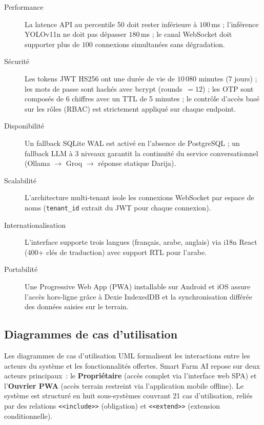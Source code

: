 \begin{description}
  \item[Performance] La latence API au percentile 50 doit rester inférieure à
        $100$\,ms ; l'inférence YOLOv11n ne doit pas dépasser $180$\,ms ; le canal
        WebSocket doit supporter plus de $100$ connexions simultanées sans dégradation.
  \item[Sécurité] Les tokens JWT HS256 ont une durée de vie de $10\,080$ minutes
        (7 jours) ; les mots de passe sont hachés avec bcrypt (rounds~$= 12$) ;
        les OTP sont composés de 6 chiffres avec un TTL de 5 minutes ; le
        contrôle d'accès basé sur les rôles (RBAC) est strictement appliqué
        sur chaque endpoint.
  \item[Disponibilité] Un fallback SQLite WAL est activé en l'absence de PostgreSQL ;
        un fallback LLM à 3 niveaux garantit la continuité du service conversationnel
        (Ollama $\rightarrow$ Groq $\rightarrow$ réponse statique Darija).
  \item[Scalabilité] L'architecture multi-tenant isole les connexions WebSocket par
        espace de noms (\texttt{tenant\_id} extrait du JWT pour chaque connexion).
  \item[Internationalisation] L'interface supporte trois langues (français, arabe,
        anglais) via i18n React (400+ clés de traduction) avec support RTL pour
        l'arabe.
  \item[Portabilité] Une Progressive Web App (PWA) installable sur Android et iOS
        assure l'accès hors-ligne grâce à Dexie IndexedDB et la synchronisation
        différée des données saisies sur le terrain.
\end{description}

\subsection{Diagrammes de cas d'utilisation}
\label{sec:uc}

Les diagrammes de cas d'utilisation UML formalisent les interactions entre les acteurs
du système et les fonctionnalités offertes. Smart Farm AI repose sur deux acteurs
principaux~: le \textbf{Propriétaire} (accès complet via l'interface web SPA) et
l'\textbf{Ouvrier PWA} (accès terrain restreint via l'application mobile offline).
Le système est structuré en huit sous-systèmes couvrant 21 cas d'utilisation,
reliés par des relations \texttt{<<include>>} (obligation) et \texttt{<<extend>>}
(extension conditionnelle).

